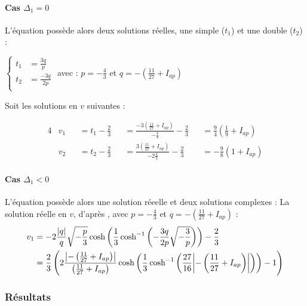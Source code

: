 \documentclass[12pt,a4paper,onecolumn]{article}
\begin{document}
\paragraph{Cas $\Delta_1 = 0$} L'équation possède alors deux solutions réelles, une simple ($t_1$) et une double ($t_2$) :

$\left\{
\begin{array}{rl}
t_1 &= \displaystyle{\frac{3q}{p}}\\
t_2 &= \displaystyle{\frac{-3q}{2p}}\\
\end{array}
\right.$
avec :
$p = -\displaystyle{\frac{4}{3}}$ et $q = -\displaystyle{\left(\frac{11}{27} + I_{ap}\right)}$

Soit les solutions en $v$ suivantes :

\begin{alignat}{4}
&v_1 &&= t_1 - \frac{2}{3} &&= \displaystyle{\frac{-3(\frac{11}{27} + I_{ap})}{-\frac{4}{3}} - \frac{2}{3}} &&= \frac{9}{4}\left(\frac{1}{9} + I_{ap}\right) \label{Branche4}\\
&v_2 &&= t_2 - \frac{2}{3} &&= \displaystyle{\frac{3(\frac{11}{27} + I_{ap})}{-2\frac{4}{3}} - \frac{2}{3}} &&= -\frac{9}{8}\left(1 + I_{ap}\right)
\label{Branche5}
\end{alignat}

\paragraph{Cas $\Delta_1 < 0$} L'équation possède alors une solution réeelle et deux solutions complexes :
La solution réelle en $v$, d'après \cite{holmes200286}, avec $p = -\displaystyle{\frac{4}{3}}$ et $q = -\displaystyle{\left(\frac{11}{27} + I_{ap}\right)}$ :
\begin{align}
v_1 &= \displaystyle{-2\frac{\abs{q}}{q}\sqrt{-\frac{p}{3}}\cosh\left(\frac{1}{3}\cosh^{-1}\left(-\frac{3q}{2p}\sqrt{-\frac{3}{p}}\right)\right)-\frac{2}{3}} \nonumber\\
&= \displaystyle{\frac{2}{3}\left(2\frac{\abs{-\left(\frac{11}{27} + I_{ap}\right)}}{\left(\frac{11}{27} +  I_{ap}\right)}\cosh\left(\frac{1}{3}\cosh^{-1}\left(\frac{27}{16}\abs{-\left(\frac{11}{27} + I_{ap}\right)}\right)\right) - 1\right)}
\label{Branche6}
\end{align}

\subsubsection{Résultats}
\end{document}

